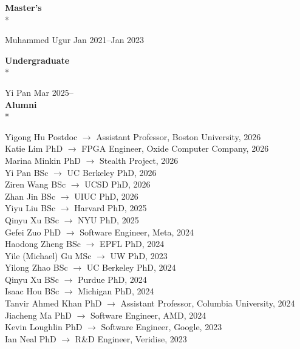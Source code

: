 \documentclass[10pt]{article}
\newcommand{\mysub}[3]{\textbf{#1} {#2} \hfill {\em #3}}
\begin{document}
\mysub{Master's}{}{} \\*

Muhammed Ugur \hfill Jan 2021--Jan 2023

\mysub{Undergraduate}{}{} \\*

Yi Pan \hfill Mar 2025--\\

\mysub{Alumni}{}{} \\*

Yigong Hu \hfill Postdoc $\rightarrow$ Assistant Professor, Boston University, 2026\\
Katie Lim \hfill PhD $\rightarrow$ FPGA Engineer, Oxide Computer Company, 2026\\
Marina Minkin \hfill PhD $\rightarrow$ Stealth Project, 2026\\
Yi Pan \hfill BSc $\rightarrow$ UC Berkeley PhD, 2026\\
Ziren Wang \hfill BSc $\rightarrow$ UCSD PhD, 2026\\
Zhan Jin \hfill BSc $\rightarrow$ UIUC PhD, 2026\\
Yiyu Liu \hfill BSc $\rightarrow$ Harvard PhD, 2025\\
Qinyu Xu \hfill BSc $\rightarrow$ NYU PhD, 2025\\
Gefei Zuo \hfill PhD $\rightarrow$ Software Engineer, Meta, 2024\\
Haodong Zheng \hfill BSc $\rightarrow$ EPFL PhD, 2024\\
Yile (Michael) Gu \hfill MSc $\rightarrow$ UW PhD, 2023\\
Yilong Zhao \hfill BSc $\rightarrow$ UC Berkeley PhD, 2024\\
Qinyu Xu \hfill BSc $\rightarrow$ Purdue PhD, 2024\\
Isaac Hou \hfill BSc $\rightarrow$ Michigan PhD, 2024\\
Tanvir Ahmed Khan \hfill PhD $\rightarrow$ Assistant Professor, Columbia University, 2024\\
Jiacheng Ma \hfill PhD $\rightarrow$ Software Engineer, AMD, 2024\\
Kevin Loughlin \hfill PhD $\rightarrow$ Software Engineer, Google, 2023\\
Ian Neal \hfill PhD $\rightarrow$ R\&D Engineer, Veridise, 2023\\
\end{document}
